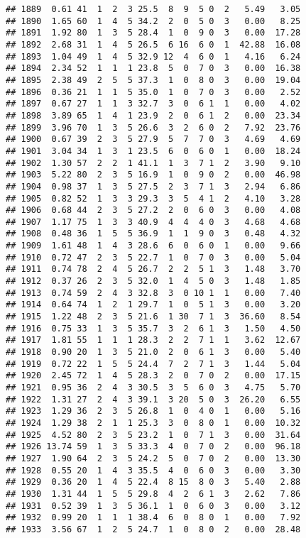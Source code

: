 \documentclass[
]{article}
\begin{document}
\begin{verbatim}
## 1889  0.61 41  1  2  3 25.5  8  9  5 0  2   5.49   3.05
## 1890  1.65 60  1  4  5 34.2  2  0  5 0  3   0.00   8.25
## 1891  1.92 80  1  3  5 28.4  1  0  9 0  3   0.00  17.28
## 1892  2.68 31  1  4  5 26.5  6 16  6 0  1  42.88  16.08
## 1893  1.04 49  1  4  5 32.9 12  4  6 0  1   4.16   6.24
## 1894  2.34 52  1  1  1 23.8  5  0  7 0  3   0.00  16.38
## 1895  2.38 49  2  5  5 37.3  1  0  8 0  3   0.00  19.04
## 1896  0.36 21  1  1  5 35.0  1  0  7 0  3   0.00   2.52
## 1897  0.67 27  1  1  3 32.7  3  0  6 1  1   0.00   4.02
## 1898  3.89 65  1  4  1 23.9  2  0  6 1  2   0.00  23.34
## 1899  3.96 70  1  3  5 26.6  3  2  6 0  2   7.92  23.76
## 1900  0.67 39  2  3  5 27.9  5  7  7 0  3   4.69   4.69
## 1901  3.04 34  1  3  1 23.5  6  0  6 0  1   0.00  18.24
## 1902  1.30 57  2  2  1 41.1  1  3  7 1  2   3.90   9.10
## 1903  5.22 80  2  3  5 16.9  1  0  9 0  2   0.00  46.98
## 1904  0.98 37  1  3  5 27.5  2  3  7 1  3   2.94   6.86
## 1905  0.82 52  1  3  3 29.3  3  5  4 1  2   4.10   3.28
## 1906  0.68 44  2  3  5 27.2  2  0  6 0  3   0.00   4.08
## 1907  1.17 75  1  3  3 40.9  4  4  4 0  3   4.68   4.68
## 1908  0.48 36  1  5  5 36.9  1  1  9 0  3   0.48   4.32
## 1909  1.61 48  1  4  3 28.6  6  0  6 0  1   0.00   9.66
## 1910  0.72 47  2  3  5 22.7  1  0  7 0  3   0.00   5.04
## 1911  0.74 78  2  4  5 26.7  2  2  5 1  3   1.48   3.70
## 1912  0.37 26  2  3  5 32.0  1  4  5 0  3   1.48   1.85
## 1913  0.74 59  2  4  3 32.8  3  0 10 1  1   0.00   7.40
## 1914  0.64 74  1  2  1 29.7  1  0  5 1  3   0.00   3.20
## 1915  1.22 48  2  3  5 21.6  1 30  7 1  3  36.60   8.54
## 1916  0.75 33  1  3  5 35.7  3  2  6 1  3   1.50   4.50
## 1917  1.81 55  1  1  1 28.3  2  2  7 1  1   3.62  12.67
## 1918  0.90 20  1  3  5 21.0  2  0  6 1  3   0.00   5.40
## 1919  0.72 22  1  5  5 24.4  7  2  7 1  3   1.44   5.04
## 1920  2.45 72  1  4  5 28.3  2  0  7 0  2   0.00  17.15
## 1921  0.95 36  2  4  3 30.5  3  5  6 0  3   4.75   5.70
## 1922  1.31 27  2  4  3 39.1  3 20  5 0  3  26.20   6.55
## 1923  1.29 36  2  3  5 26.8  1  0  4 0  1   0.00   5.16
## 1924  1.29 38  2  1  1 25.3  3  0  8 0  1   0.00  10.32
## 1925  4.52 80  2  3  5 23.2  1  0  7 1  3   0.00  31.64
## 1926 13.74 59  1  3  5 33.3  4  0  7 0  2   0.00  96.18
## 1927  1.90 64  2  3  5 24.2  5  0  7 0  2   0.00  13.30
## 1928  0.55 20  1  4  3 35.5  4  0  6 0  3   0.00   3.30
## 1929  0.36 20  1  4  5 22.4  8 15  8 0  3   5.40   2.88
## 1930  1.31 44  1  5  5 29.8  4  2  6 1  3   2.62   7.86
## 1931  0.52 39  1  3  5 36.1  1  0  6 0  3   0.00   3.12
## 1932  0.99 20  1  1  1 38.4  6  0  8 0  1   0.00   7.92
## 1933  3.56 67  1  2  5 24.7  1  0  8 0  2   0.00  28.48

\end{verbatim}
\end{document}
